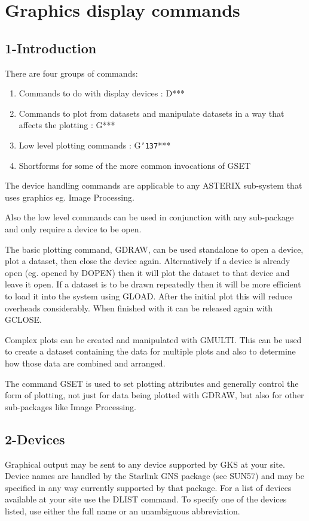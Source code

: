 \documentclass{book}
\renewcommand{\_}{{\tt\char'137}}     %
\begin{document}
\chapter{Graphics display commands}
\section{1-Introduction}
There are four groups of commands:
 
\begin{enumerate}
\item Commands to do with display devices : D***
\item Commands to plot from datasets and manipulate
datasets in a way that affects the plotting : G***
\item Low level plotting commands : G\_***
\item Shortforms for some of the more common
invocations of GSET
\end{enumerate}
The device handling commands are applicable to any ASTERIX
sub-system that uses graphics eg. Image Processing.
 
Also the low level commands can be used in conjunction with
any sub-package and only require a device to be open.
 
The basic plotting command, GDRAW, can be used standalone to
open a device, plot a dataset, then close the device again.
Alternatively if a device is already open (eg. opened by DOPEN)
then it will plot the dataset to that device and leave it open.
If a dataset is to be drawn repeatedly then it will be more
efficient to load it into the system using GLOAD. After the
initial plot this will reduce overheads considerably. When
finished with it can be released again with GCLOSE.
 
Complex plots can be created and manipulated with GMULTI.
This can be used to create a dataset containing the data
for multiple plots and also to determine how those data are
combined and arranged.
 
The command GSET is used to set plotting attributes and generally
control the form of plotting, not just for data being plotted with
GDRAW, but also for other sub-packages like Image Processing.
 
\section{2-Devices}
Graphical output may be sent to any device supported by GKS at
your site. Device names are handled by the Starlink GNS package
(see SUN57) and may be specified in any way currently supported
by that package. For a list of devices available at your site
use the DLIST command. To specify one of the devices listed,
use either the full name or an unambiguous abbreviation.
 
\end{document}
